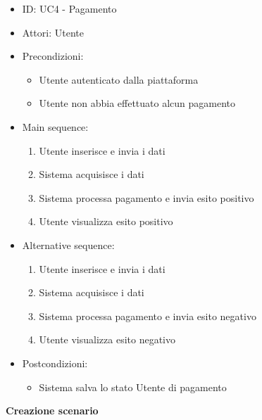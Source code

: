 \documentclass{article}
\begin{document}
\begin{itemize}[label = { }]
    \itemsep0px
    \item ID: UC4 - Pagamento
    \item Attori: Utente
    \item Precondizioni: 
        \begin{itemize}[label = {-}]
            \item Utente autenticato dalla piattaforma
            \item Utente non abbia effettuato alcun pagamento
        \end{itemize}
    \item Main sequence: 
        \begin{enumerate}
            \item Utente inserisce e invia i dati
            \item Sistema acquisisce i dati
            \item Sistema processa pagamento e invia esito positivo
            \item Utente visualizza esito positivo
        \end{enumerate}
    \item Alternative sequence:
        \begin{enumerate}
            \item Utente inserisce e invia i dati
            \item Sistema acquisisce i dati
            \item Sistema processa pagamento e invia esito negativo
            \item Utente visualizza esito negativo
        \end{enumerate}
    \item Postcondizioni: 
        \begin{itemize}[label = {-}]
            \item Sistema salva lo stato Utente di pagamento
        \end{itemize}
\end{itemize}
\textbf{Creazione scenario}
\end{document}
